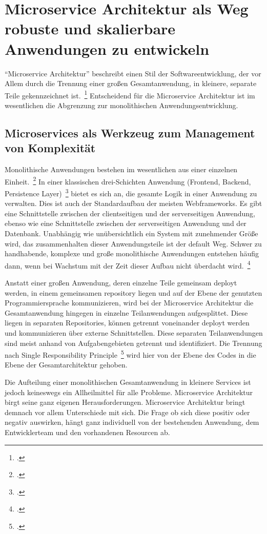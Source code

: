 \chapter{Microservice Architektur als Weg robuste und skalierbare Anwendungen zu entwickeln}
``Microservice Architektur'' beschreibt einen Stil der Softwareentwicklung, der vor Allem durch die Trennung einer großen Gesamtanwendung, in kleinere, separate Teile gekennzeichnet ist.~\footcite[vgl.][Seite 2]{newman2015building}
Entscheidend für die Microservice Architektur ist im wesentlichen die Abgrenzung zur monolithischen Anwendungsentwicklung.

\section{Microservices als Werkzeug zum Management von Komplexität}
Monolithische Anwendungen bestehen im wesentlichen aus einer einzelnen Einheit.~\footcite[vgl.][]{Fowler:Intro} In einer klassischen drei-Schichten Anwendung (Frontend, Backend, Persistence Layer)~\footcite[vgl.][]{MSDN:TTA} bietet es sich an, die gesamte Logik in einer Anwendung zu verwalten. Dies ist auch der Standardaufbau der meisten Webframeworks. Es gibt eine Schnittstelle zwischen der clientseitigen und der serverseitigen Anwendung, ebenso wie eine Schnittstelle zwischen der serverseitigen Anwendung und der Datenbank. Unabhängig wie unübersichtlich ein System mit zunehmender Größe wird, das zusammenhalten dieser Anwendungsteile ist der default Weg. Schwer zu handhabende, komplexe und große monolithische Anwendungen entstehen häufig dann, wenn bei Wachstum mit der Zeit dieser Aufbau nicht überdacht wird.~\footcite[vgl.][]{infaktuell}

Anstatt einer großen Anwendung, deren einzelne Teile gemeinsam deployt werden, in einem gemeinsamen repository liegen und auf der Ebene der genutzten Programmiersprache kommunizieren, wird bei der Microservice Architektur die Gesamtanwendung hingegen in einzelne Teilanwendungen aufgesplittet. Diese liegen in separaten Repositories, können getrennt voneinander deployt werden und kommunizieren über externe Schnittstellen. Diese separaten Teilanwendungen sind meist anhand von Aufgabengebieten getrennt und identifiziert. Die Trennung nach Single Responsibility Principle~\footcite[vgl.][Seite 108]{Martin:SRP} wird hier von der Ebene des Codes in die Ebene der Gesamtarchitektur gehoben.

Die Aufteilung einer monolithischen Gesamtanwendung in kleinere Services ist jedoch keineswegs ein Allheilmittel für alle Probleme. Microservice Architektur birgt seine ganz eigenen Herausforderungen. Microservice Architektur bringt demnach vor allem Unterschiede mit sich. Die Frage ob sich diese positiv oder negativ auswirken, hängt ganz individuell von der bestehenden Anwendung, dem Entwicklerteam und den vorhandenen Resourcen ab.

